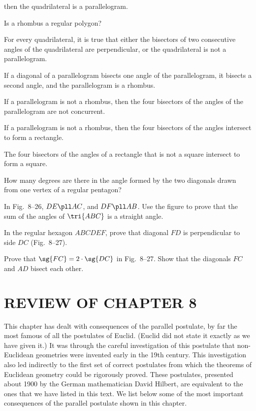 \documentclass[11pt]{book}
\theoremstyle{bkplain}
\theoremstyle{XIplainnote}
\theoremstyle{bkplain}
\theoremstyle{bkplain}
\begin{document}
\begin{exercisecols}
\begin{exlist}
  then the quadrilateral is a parallelogram.
\item Is a rhombus a regular polygon?
\item For every quadrilateral, it is true that either the bisectors of two
  consecutive angles of the quadrilateral are perpendicular, or the
  quadrilateral is not a parallelogram.
\item If a diagonal of a parallelogram bisects one angle of the parallelogram,
  it bisects a second angle, and the parallelogram is a rhombus.
\item If a parallelogram is not a rhombus, then the four bisectors of the
  angles of the parallelogram are not concurrent.
\item If a parallelogram is not a rhombus, then the four bisectors of the
  angles intersect to form a rectangle.
\item The four bisectors of the angles of a rectangle that is not a square
  intersect to form a square.
\item How many degrees are there in the angle formed by the two diagonals
  drawn from one vertex of a regular pentagon?
\item In Fig.~8--26, $DE \pll AC$, and $DF \pll AB$. Use the figure to prove
  that the sum of the angles of $\tri{ABC}$ is a straight angle.
\exfig{\FIGVIIITWENTYSIX}
\item In the regular hexagon $ABCDEF$, prove that diagonal $FD$ is
  perpendicular to side $DC$ (Fig.~8--27).
\exfig{\FIGVIIITWENTYSEVEN}
\item Prove that $\sg{FC} = 2 \cdot \sg{DC}$ in Fig.~8--27. Show that the
  diagonals $FC$ and $AD$ bisect each other.
\end{exlist}
\end{exercisecols}

\section*{REVIEW OF CHAPTER 8}

This chapter has dealt with consequences of the parallel postulate, by far the
most famous of all the postulates of Euclid. (Euclid did not state it exactly
as we have given it.) It was through the careful investigation of this
postulate that non-Euclidean geometries were invented early in the 19th
century. This investigation also led indirectly to the first set of correct
postulates from which the theorems of Euclidean geometry could be rigorously
proved. These postulates, presented about 1900 by the German mathematician
David Hilbert, are equivalent to the ones that we have listed in this text. We
list below some of the most important consequences of the parallel postulate
shown in this chapter.
\end{document}
